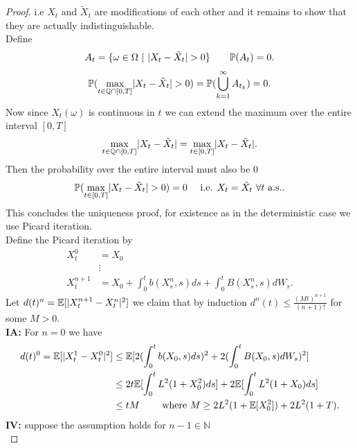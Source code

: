 \begin{proof}
 i.e $X_t$ and $\tilde{X}_t $ are modifications of each other and it remains to show that they are actually
 indistinguishable.\\[1ex]
 Define 
 \begin{align*}
  A_t = \{ \omega  \in  \Omega  \ | \ \lvert X_t - \tilde{X}_t  \rvert > 0\}   \qquad \mathbb{P}(A_t) = 0
 .\end{align*}
 \begin{align*}
   \mathbb{P}(\max_{t \in  \mathbb{Q} \cap [0,T]} \lvert X_t-\tilde{X}_t \rvert > 0 ) = \mathbb{P}(\bigcup_{k=1}^{\infty} A_{t_k} ) = 0
 .\end{align*}
 Now since $X_t(\omega )$ is continuous in $t$ we can extend the maximum over the entire interval $[0,T]$ 
 \begin{align*}
   \max_{t \in  \mathbb{Q} \cap [0,T]} \lvert X_t - \tilde{X}_t\rvert = \max_{t \in  [0,T]} \lvert X_t - \tilde{X}_t\rvert
 .\end{align*}
 Then the probability over the entire interval must also be 0 
 \begin{align*}
   \mathbb{P}(\max_{t \in  [0,T]} \lvert X_t - \tilde{X}_t\rvert >0)  = 0 \quad \text{ i.e. } X_t = \tilde{X}_t \ \forall  t \text{ a.s.} 
 .\end{align*}
 This concludes the uniqueness proof, for existence as in the deterministic case we use Picard iteration.\\[1ex]
 Define the Picard iteration by  
 \begin{align*}
   X_t^{0} &= X_0  \\
           &\vdots\\
   X_t^{n+1} &= X_0 + \int_0^{t} b(X_s^{n},s ) ds + \int_0^{t} B(X_s^{n},s ) dW_s   
 .\end{align*}
 Let $d(t)^{n} = \mathbb{E}[\lvert X_t^{n+1}-X_t^{n}\rvert^2] $ we claim that by induction $d^{n}(t) \le  \frac{(Mt)^{n+1} }{(n+1)!} $ for some $M>0$.\\
  \textbf{IA:} For $n=0$ we have
  \begin{align*}
    d(t)^{0} = \mathbb{E}[\lvert X_t^1-X_t^0\rvert^2] &\le  \mathbb{E}[2 (\int_0^{t} b(X_0,s) ds )^2 + 2 (\int_0^{t} B(X_0,s )dW_s )^2]  \\
                                       &\le  2t \mathbb{E}[\int_0^{t} L^2(1+X_{0}^2) ds ] + 2\mathbb{E}[\int_0^{t} L^2(1+X_{0}) ds ] \\
                                       &\le  tM \qquad \text{ where } M\ge 2L^2(1+\mathbb{E}[X_{0}^2]) +2L^2(1+T)
  .\end{align*}
  \textbf{IV:} suppose the assumption holds for $n-1 \in  \mathbb{N}$\\

\end{proof}
